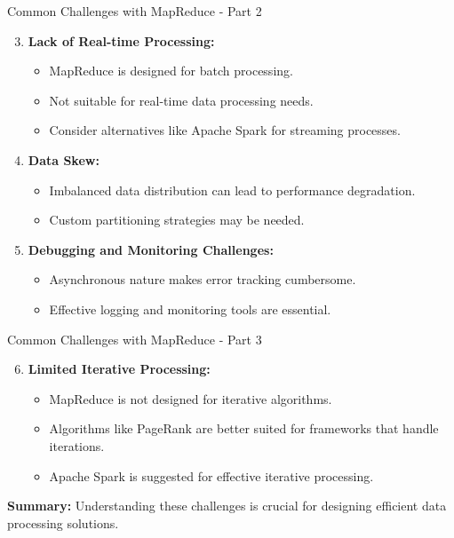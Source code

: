 \documentclass[aspectratio=169]{beamer}
\begin{document}
\begin{frame}[fragile]{Common Challenges with MapReduce - Part 2}
    \begin{enumerate}
        \setcounter{enumi}{2}
        \item \textbf{Lack of Real-time Processing:}
            \begin{itemize}
                \item MapReduce is designed for batch processing.
                \item Not suitable for real-time data processing needs.
                \item Consider alternatives like Apache Spark for streaming processes.
            \end{itemize}
        
        \item \textbf{Data Skew:}
            \begin{itemize}
                \item Imbalanced data distribution can lead to performance degradation.
                \item Custom partitioning strategies may be needed.
            \end{itemize}
        
        \item \textbf{Debugging and Monitoring Challenges:}
            \begin{itemize}
                \item Asynchronous nature makes error tracking cumbersome.
                \item Effective logging and monitoring tools are essential.
            \end{itemize}
    \end{enumerate}
\end{frame}

\begin{frame}{Common Challenges with MapReduce - Part 3}
    \begin{enumerate}
        \setcounter{enumi}{5}
        \item \textbf{Limited Iterative Processing:}
            \begin{itemize}
                \item MapReduce is not designed for iterative algorithms.
                \item Algorithms like PageRank are better suited for frameworks that handle iterations.
                \item Apache Spark is suggested for effective iterative processing.
            \end{itemize}
    \end{enumerate}

    \textbf{Summary:} Understanding these challenges is crucial for designing efficient data processing solutions.
\end{frame}
\end{document}
